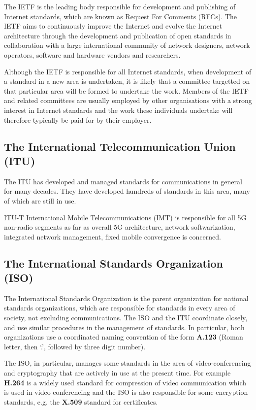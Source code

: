 The IETF is the leading body responsible for development and publishing of
Internet standards, which are known as Request For Comments (RFCs). 
The IETF aims to continuously improve the Internet and
evolve the Internet architecture through the development and publication
of open standards in collaboration with a large international community
of network designers, network operators, software and hardware vendors
and researchers.

Although the IETF is responsible for all Internet standards, when development
of a standard in a new area is undertaken, it is likely that a committee targetted
on that particular area will be formed to undertake the work. Members of the IETF
and related committees are usually employed by other organisations with a strong
interest in Internet standards and the work these individuals undertake will
therefore typically be paid for by their employer.

\subsection{The International Telecommunication Union (ITU)}\label{ITU}

The ITU has developed and managed standards for communications in general
for many decades. They have developed hundreds of standards in this area, many
of which are still in use.

ITU-T International Mobile Telecommunications (IMT) is responsible for all 5G non-radio
segments as far as overall 5G architecture, network softwarization,
integrated network management, fixed mobile convergence is concerned.


\subsection{The International Standards Organization (ISO)}

The International Standards Organization is the parent organization for national standards
organizations, which are responsible for standards in every area of society, not
excluding communications. The ISO and the ITU coordinate closely, and use similar
procedures in the management of standards. In particular, both organizations use
a coordinated naming convention of the form {\bf A.123} (Roman letter, then `.',
followed by three digit number).

The ISO, in particular, manages some standards in the area of video-conferencing
and cryptography that are actively in use at the present time. For example {\bf H.264}
is a widely used standard for compression of video communication which is used
in video-conferencing and the ISO is also responsible
for some encryption standards, e.g. the {\bf X.509} standard for certificates.

